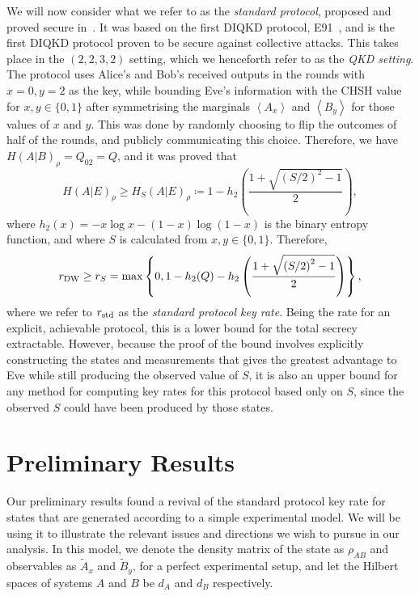 \documentclass[10pt, a4paper]{article}
\numberwithin{equation}{section} %
\theoremstyle{definition}
\theoremstyle{plain}
\newcommand{\?}{\mathrel{?}} %
\newcommand{\angleb}[1]{\left\langle #1 \right\rangle} %
\newcommand{\DW}{\rm DW}
\newcommand{\std}{\rm std}
\begin{document}
    We will now consider what we refer to as the \emph{standard protocol}, proposed and proved secure in~\cite{DIQKD_Lower}. It was based on the first DIQKD protocol, E91~\cite{E91}, and is the first DIQKD protocol proven to be secure against collective attacks. This takes place in the \((2,2,3,2)\) setting, which we henceforth refer to as the \emph{QKD setting}. The protocol uses Alice's and Bob's received outputs in the rounds with \(x = 0, y = 2\) as the key, while bounding Eve's information with the CHSH value for \(x,y \in \{0,1\}\) after symmetrising the marginals \(\angleb{A_x}\) and \(\angleb{B_y}\) for those values of \(x\) and \(y\). This was done by randomly choosing to flip the outcomes of half of the rounds, and publicly communicating this choice. Therefore, we have \({H(A|B)}_{\rho} = Q_{02} = Q\), and it was proved that
    \begin{equation}
      {H(A|E)}_{\rho} \geq {H_S(A|E)}_{\rho} \coloneqq 1 - h_2\left( \frac{1 + \sqrt{{(S/2)}^2-1}}{2} \right),
    \end{equation}
    where \(h_2(x) = - x \log x - (1-x) \log (1-x)\) is the binary entropy function, and where \(S\) is calculated from \(x,y \in \{0,1\}\). Therefore,
    \begin{equation}
      r_{\DW} \geq r_{S} = \max \left\{ 0, 1 - h_2(Q) - h_2\left( \frac{1 + \sqrt{{(S/2)}^2-1}}{2} \right) \right\},
    \end{equation}
    where we refer to \(r_{\std}\) as the \emph{standard protocol key rate}. Being the rate for an explicit, achievable protocol, this is a lower bound for the total secrecy extractable. However, because the proof of the bound involves explicitly constructing the states and measurements that gives the greatest advantage to Eve while still producing the observed value of \(S\), it is also an upper bound for any method for computing key rates for this protocol based only on \(S\), since the observed \(S\) could have been produced by those states.

    \section{Preliminary Results}\label{sec:preres}

    Our preliminary results found a revival of the standard protocol key rate for states that are generated according to a simple experimental model. We will be using it to illustrate the relevant issues and directions we wish to pursue in our analysis. In this model, we denote the density matrix of the state as \(\rho_{AB}\) and observables as \(\tilde{A}_x\) and \(\tilde{B}_y\), for a perfect experimental setup, and let the Hilbert spaces of systems \(A\) and \(B\) be \(d_A\) and \(d_B\) respectively.
\end{document}
